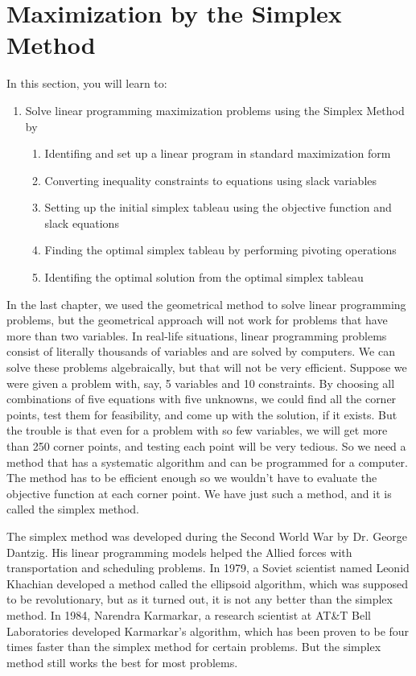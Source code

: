 \section{Maximization by the Simplex Method}
In this section, you will learn to:
\begin{enumerate}
    \item Solve linear programming maximization problems using the Simplex Method by
          \begin{enumerate}
              \item Identifing and set up a linear program in standard maximization form
              \item Converting inequality constraints to equations using slack variables
              \item Setting up the initial simplex tableau using the objective function and slack equations
              \item Finding the optimal simplex tableau by performing pivoting operations
              \item Identifing the optimal solution from the optimal simplex tableau
          \end{enumerate}
\end{enumerate}

In the last chapter, we used the geometrical method to solve linear programming problems, but the geometrical approach will not work for problems that have more than two variables. In real-life situations, linear programming problems consist of literally thousands of variables and are solved by computers. We can solve these problems algebraically, but that will not be very efficient. Suppose we were given a problem with, say, 5 variables and 10 constraints. By choosing all combinations of five equations with five unknowns, we could find all the corner points, test them for feasibility, and come up with the solution, if it exists. But the trouble is that even for a problem with so few variables, we will get more than 250 corner points, and testing each point will be very tedious. So we need a method that has a systematic algorithm and can be programmed for a computer. The method has to be efficient enough so we wouldn't have to evaluate the objective function at each corner point. We have just such a method, and it is called the simplex method.

The simplex method was developed during the Second World War by Dr. George Dantzig. His linear programming models helped the Allied forces with transportation and scheduling problems. In 1979, a Soviet scientist named Leonid Khachian developed a method called the ellipsoid algorithm, which was supposed to be revolutionary, but as it turned out, it is not any better than the simplex method. In 1984, Narendra Karmarkar, a research scientist at AT\&T Bell Laboratories developed Karmarkar's algorithm, which has been proven to be four times faster than the simplex method for certain problems. But the simplex method still works the best for most problems.

